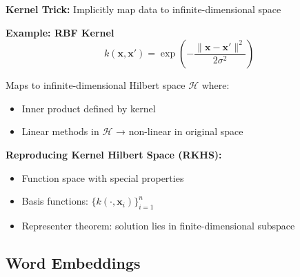 \documentclass[12pt,a4paper]{article}
\theoremstyle{definition}
\begin{document}
\begin{tcolorbox}[enhanced,breakable,colback=purple!5!white,colframe=purple!75!black,title=Infinite-Dimensional Feature Spaces]
\textbf{Kernel Trick:} Implicitly map data to infinite-dimensional space

\textbf{Example: RBF Kernel}
\begin{equation}
k(\mathbf{x}, \mathbf{x}') = \exp\left(-\frac{\|\mathbf{x} - \mathbf{x}'\|^2}{2\sigma^2}\right)
\end{equation}

Maps to infinite-dimensional Hilbert space $\mathcal{H}$ where:
\begin{itemize}
    \item Inner product defined by kernel
    \item Linear methods in $\mathcal{H}$ → non-linear in original space
\end{itemize}

\textbf{Reproducing Kernel Hilbert Space (RKHS):}
\begin{itemize}
    \item Function space with special properties
    \item Basis functions: $\{k(\cdot, \mathbf{x}_i)\}_{i=1}^n$
    \item Representer theorem: solution lies in finite-dimensional subspace
\end{itemize}
\end{tcolorbox}

\subsection{Word Embeddings}
\end{document}
